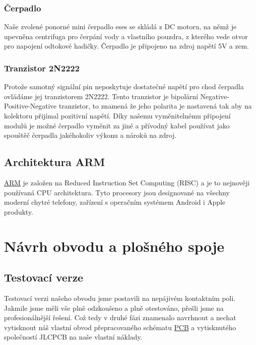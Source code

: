 \documentclass[12pt,a4paper]{article}
\begin{document}
\subsubsection{Čerpadlo}

Naše zvolené ponorné mini čerpadlo eses se skládá z DC motoru, na němž je upevněna centrifuga pro čerpání vody a vlastního pouzdra, z kterého vede otvor pro napojení odtokové hadičky. Čerpadlo je připojeno na zdroj napětí 5V a zem.

\subsubsection{Tranzistor 2N2222}

Protože samotný signální pin neposkytuje dostatečné napětí pro chod čerpadla ovládáme jej tranzistorem 2N2222. Tento tranzistor je bipolární Negative-Positive-Negative tranzistor, to znamená že jeho polarita je nastavená tak aby na kolektoru přijímal pozitivní napětí. Díky našemu vyměnitelnému připojení modulů je možné čerpadlo vyměnit za jiné a přívodný kabel používat jako spouštěč čerpadla jakéhokoliv výkonu a nároků na zdroj.

\subsection{Architektura ARM}

\underline{\ac{ARM}} je založen na Reduced Instruction Set Computing (RISC) a je to nejnověji používaná CPU architektura. Tyto procesory jsou designované na všechny moderní chytré telefony, zařízení s operačním systémem Android i Apple produkty.

\clearpage

\section{Návrh obvodu a plošného spoje}

\subsection{Testovací verze}

Testovací verzi našeho obvodu jsme postavili na nepájivém kontaktním poli. Jakmile jsme měli vše plně odzkoušeno a plně otestováno, přešli jsme na profesionálnější řešení. Což tedy v druhé fázi znamenalo navrhnout a nechat vytisknout náš vlastní obvod přepracovaného schématu \underline{\ac{PCB}} a vytisknutého společností JLCPCB na naše vlastní náklady.
\end{document}
